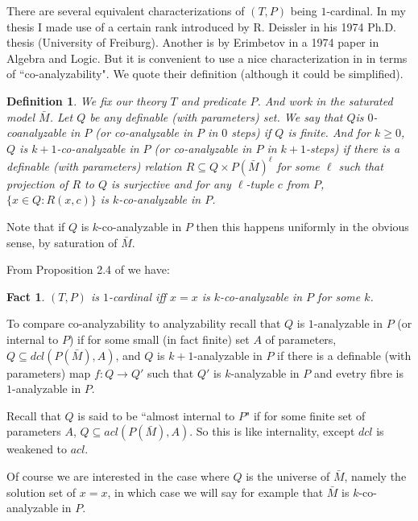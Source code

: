 \documentclass[12pt]{article}
\newtheorem{Definition}[Theorem]{Definition}
\newtheorem{Fact}[Theorem]{Fact}
\begin{document}
There are several equivalent characterizations of $(T,P)$ being $1$-cardinal.  In my thesis I made use of a certain rank introduced by R. Deissler in his 1974 Ph.D. thesis (University of Freiburg).  Another is by Erimbetov in a 1974 paper in Algebra and Logic.  But it is convenient to use a nice characterization in \cite{Herwig-Hrushovski-Macpherson} in terms of ``co-analyzability". We quote their definition (although it could be simplified).
\begin{Definition} We fix our theory $T$ and predicate $P$.  And work in the saturated model ${\bar M}$. Let $Q$ be any definable (with parameters) set. 
We say that $Q$is $0$-coanalyzable in $P$ (or co-analyzable in $P$ in $0$ steps) if $Q$ is finite.
And for $k\geq 0$, $Q$ is $k+1$-co-analyzable in $P$ (or co-analyzable in $P$ in $k+1$-steps)  if there is a definable (with parameters) relation $R\subseteq  Q\times P({\bar M})^{\ell}$ for some $\ell$ such that projection of $R$ to $Q$ is surjective and for any $\ell$-tuple $c$ from $P$,  $\{x\in Q: R(x,c)\}$ is $k$-co-analyzable in $P$.
\end{Definition} 

Note that if $Q$ is $k$-co-analyzable in $P$ then this happens uniformly in the obvious sense, by saturation of ${\bar M}$.

From Proposition 2.4 of \cite{Herwig-Hrushovski-Macpherson} we have:
\begin{Fact} $(T,P)$ is $1$-cardinal iff $x=x$ is  $k$-co-analyzable in $P$ for some $k$. 
\end{Fact} 

To compare co-analyzability to analyzability recall that $Q$ is $1$-analyzable in  $P$  (or internal to $P$) if for some small (in fact finite) set $A$ of parameters, $Q\subseteq dcl(P({\bar M}), A)$,  and $Q$ is $k+1$-analyzable in $P$ if there is a definable (with parameters) map $f:Q\to Q'$ such that $Q'$ is $k$-analyzable in $P$ and evetry fibre is $1$-analyzable in $P$. 

Recall that $Q$ is said to be ``almost internal to $P$" if for some finite set of parameters $A$, $Q\subseteq acl(P({\bar M}), A)$.  So this is like internality, except $dcl$ is weakened to $acl$. 

Of course we are interested in the case where $Q$ is the universe of ${\bar M}$, namely the solution set of $x=x$, in which case we will say for example that ${\bar M}$ is $k$-co-analyzable in $P$. 
\end{document}
